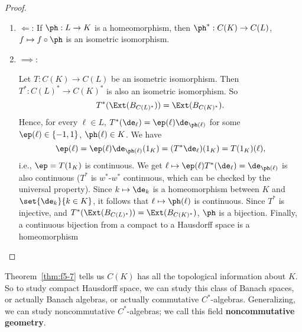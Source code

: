 \begin{proof}
\begin{enumerate}
\item
$\Leftarrow$: If $\ph:L\to K$ is a homeomorphism, then $\ph^*:C(K)\to C(L)$, $f\mapsto f\circ \ph$ is an isometric isomorphism.
\item
$\implies$: 

Let $T:C(K)\to C(L)$ be an isometric isomorphism. Then $T^*:C(L)^*\to C(K)^*$ is also an isometric isomorphism. So 
\[T^*(\Ext(B_{C(L)^*}))=\Ext(B_{C(K)^*}).\]
Hence, for every $\ell\in L$, $T^*(\de_{\ell})=\ep(\ell)\de_{\ph(\ell)}$ for some $\ep(\ell)\in \{-1,1\}$, $\ph(\ell)\in K$.  We have
\[
\ep(\ell)=\ep(\ell)\de_{\ph(\ell)} (1_K)=(T^*\de_{\ell})(1_K)=T(1_K)(\ell),
\]
i.e., $\ep=T(1_K)$ is continuous. We get $\ell\mapsto \ep(\ell)T^*(\de_{\ell})=\de_{\ph(\ell)}$ is also continuous ($T^*$ is $w^*$-$w^*$ continuous, which can be checked by the universal property). Since $k\mapsto \de_k$ is a homeomorphism between $K$ and $\set{\de_k}{k\in K}$, it follows that $\ell\mapsto \ph(\ell)$ is continuous. Since $T^*$ is injective, and $T^*(\Ext(B_{C(L)^*}))=\Ext(B_{C(K)^*})$, $\ph$ is a bijection. Finally, a continuous bijection from a compact to a Hausdorff space is a homeomorphism
\end{enumerate}
\end{proof}
Theorem~\ref{thm:f5-7} tells us $C(K)$ has all the topological information about $K$. So to study compact Hausdorff space, we can study this class of Banach spaces, or actually Banach algebras, or actually commutative $C^*$-algebras. Generalizing, we can study noncommutative $C^*$-algebras; we call this field \textbf{noncommutative geometry}.
